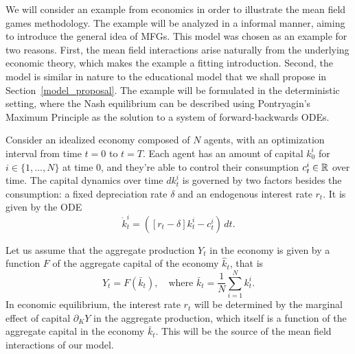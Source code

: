 
We will consider an example from economics in order to illustrate the mean field games methodology.
The example will be analyzed in a informal manner, aiming to introduce the general idea
of MFGs.
This model was chosen as an example for two reasons.
First, the mean field interactions arise naturally from the underlying economic theory, which makes the example a fitting introduction.
Second, the model is similar in nature to the educational model that we shall propose in Section~\ref{model_proposal}.
The example will be formulated in the deterministic setting, where the Nash equilibrium can be described using Pontryagin's Maximum Principle 
as the solution to a system of forward-backwards ODEs.

Consider an idealized economy composed of $N$ agents, with an optimization interval from time $t = 0$ to $t = T$.
Each agent has an amount of capital $k_0^i$ for $i \in \{1,\ldots,N\}$ at time $0$,
and they're able to control their consumption $c_t^i \in \mathbb{R}$ over time.
The capital dynamics over time $d k_t^i$ is governed by
two factors besides the consumption:
a fixed depreciation rate $\delta$ and an endogenous interest rate $r_t$.
It is given by the ODE
\begin{equation}
    \dot k_t^i =  \left( \left[r_t - \delta \right] k_t^i - c_t^i \right)\, dt.
\end{equation}

Let us assume that the aggregate production $Y_t$ in the economy is given by a function $F$ of the aggregate capital of the economy $\hat k_t$, that is
\begin{equation}
    Y_t = F(\bar k_t),\quad \text{where } \bar k_t = \frac{1}{N} \sum_{i = 1}^N k_t^i.
\end{equation}
In economic equilibrium, the interest rate $r_t$ will be determined by the marginal effect of capital $\partial_K Y$ in the aggregate production,
which itself is a function of the aggregate capital in the economy $\bar k_t$.
This will be the source of the mean field interactions of our model.

